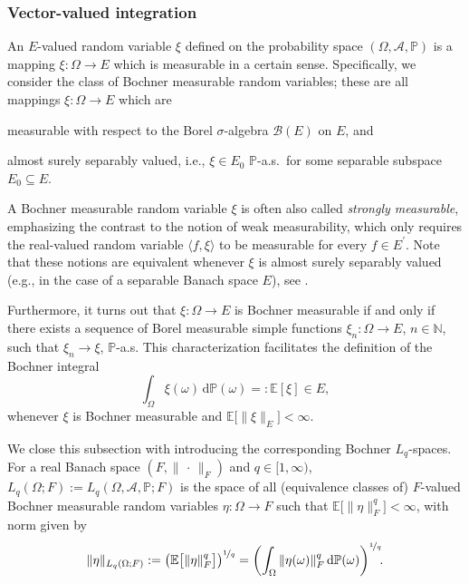 \documentclass[reqno]{amsart}
\numberwithin{equation}{section}
\newcommand{\bbE}{\mathbb{E}}
\newcommand{\bbN}{\mathbb{N}}
\newcommand{\bbP}{\mathbb{P}}
\newcommand{\cA}{\mathcal{A}}
\newcommand{\cB}{\mathcal{B}}
\newcommand{\norm}[2]{     \| #1       \|_{ #2 }}
\newcommand{\duality}[1]{     \langle #1       \rangle}
\newcommand{\dual}[1]{{#1}^{\prime}}
\newcommand{\rd}{\mathrm{d}}
\newcommand{\from}{\colon}
\theoremstyle{remark}
\theoremstyle{definition}
\begin{document}
\subsubsection{Vector-valued integration}

An $E$-valued random variable $\xi$ defined on the 
probability space $(\Omega,\cA,\bbP)$ is a mapping 
$\xi\from\Omega\to E$ 
which is measurable in a certain sense. 
Specifically, we consider the 
class of Bochner measurable 
random variables; these are all mappings 
$\xi\from\Omega\to E$ which are 
%
\begin{enumerate*} 
	\item measurable 
	with respect to the Borel $\sigma$-algebra $\cB(E)$ 
	on $E$, and 
	\item almost surely separably valued, i.e., 
	$\xi\in E_0$ $\bbP$-a.s.\ 
	for some separable subspace $E_0\subseteq E$. 
\end{enumerate*} 
% 
A Bochner measurable random variable $\xi$  
is often also called \emph{strongly measurable}, 
emphasizing the contrast to the notion 
of weak measurability, which only requires 
the real-valued random variable 
$\duality{ f, \xi }$ to be measurable 
for every $f\in \dual{E}$\!. 
Note that 
these notions are equivalent  
whenever $\xi$ is 
almost surely separably valued 
(e.g., in the case of  
a separable Banach space $E$), 
see \cite[Theorem~2.3]{JansonKaijser2015}. 


Furthermore, it turns out that 
$\xi\from\Omega\to E$ is 
Bochner measurable if and only if there 
exists a sequence of 
Borel measurable simple functions 
$\xi_n\from\Omega\to E$, $n\in\bbN$, 
such that $\xi_n \to \xi$, $\bbP$-a.s. 
This characterization facilitates the definition 
of the Bochner integral 
% 
\[
\int_{\Omega} \xi(\omega)\, \rd\bbP(\omega) 
=:  
\bbE[\xi] \in E, 
\]
%
whenever $\xi$ is Bochner measurable 
and $\bbE\bigl[ \norm{\xi}{E} \bigr] <\infty$. 

We close this subsection with introducing 
the corresponding Bochner $L_q$-spaces. 
For a real Banach space $(F,\norm{\,\cdot\,}{F})$ 
and $q\in[1,\infty)$, 
$L_q(\Omega;F):=L_q(\Omega,\cA,\bbP;F)$ 
is the space of all 
(equivalence classes of) $F$-valued 
Bochner measurable random variables 
$\eta\from\Omega\to F$ 
such that $\bbE\bigl[ \norm{\eta}{F}^q \bigr] < \infty$, 
with norm given by 
%
\[
\norm{\eta}{L_q(\Omega;F)} 
:= 
\left(
\bbE\bigl[
\norm{\eta}{F}^q
\bigr]
\right)^{\nicefrac{1}{q}} 
= 
\biggl( 
\int_{\Omega} 
\norm{\eta(\omega)}{F}^q 
\, \rd\bbP(\omega)
\biggr)^{\nicefrac{1}{q}} \!. 
\]
\end{document}
